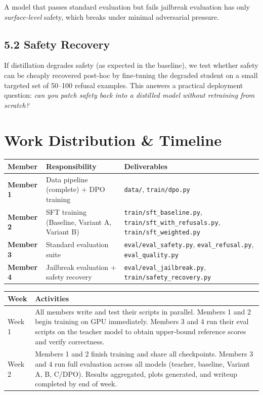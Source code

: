 \documentclass[11pt]{article}
\begin{document}
A model that passes standard evaluation but fails jailbreak evaluation has only \emph{surface-level} safety, which breaks under minimal adversarial pressure.

\subsection{5.2 Safety Recovery}

If distillation degrades safety (as expected in the baseline), we test whether safety can be cheaply recovered post-hoc by fine-tuning the degraded student on a small targeted set of 50--100 refusal examples. This answers a practical deployment question: \emph{can you patch safety back into a distilled model without retraining from scratch?}

\section{Work Distribution \& Timeline}

\begin{center}
\begin{tabular}{>{\bfseries}p{} p{} p{}}
\toprule
\textbf{Member} & \textbf{Responsibility} & \textbf{Deliverables} \\
\midrule
Member 1
  & Data pipeline (complete) + DPO training
  & \texttt{data/}, \texttt{train/dpo.py} \\
\addlinespace
Member 2
  & SFT training (Baseline, Variant A, Variant B)
  & \texttt{train/sft\_baseline.py}, \texttt{train/sft\_with\_refusals.py}, \texttt{train/sft\_weighted.py} \\
\addlinespace
Member 3
  & Standard evaluation suite
  & \texttt{eval/eval\_safety.py}, \texttt{eval\_refusal.py}, \texttt{eval\_quality.py} \\
\addlinespace
Member 4
  & Jailbreak evaluation + safety recovery
  & \texttt{eval/eval\_jailbreak.py}, \texttt{train/safety\_recovery.py} \\
\bottomrule
\end{tabular}
\end{center}

\begin{center}
\begin{tabular}{lp{}}
\toprule
\textbf{Week} & \textbf{Activities} \\
\midrule
Week 1
  & All members write and test their scripts in parallel.
    Members 1 and 2 begin training on GPU immediately.
    Members 3 and 4 run their eval scripts on the teacher model
    to obtain upper-bound reference scores and verify correctness. \\
\addlinespace
Week 2
  & Members 1 and 2 finish training and share all checkpoints.
    Members 3 and 4 run full evaluation across all models
    (teacher, baseline, Variant A, B, C/DPO).
    Results aggregated, plots generated, and writeup completed by
    end of week. \\
\bottomrule
\end{tabular}
\end{center}
\end{document}
